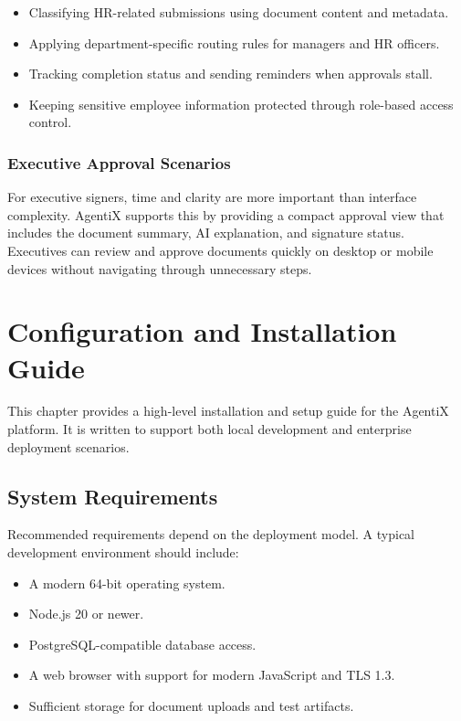 \documentclass[12pt,oneside,openright,a4paper]{cpe-english-project}
\begin{document}
\begin{itemize}
  \item Classifying HR-related submissions using document content and metadata.
  \item Applying department-specific routing rules for managers and HR officers.
  \item Tracking completion status and sending reminders when approvals stall.
  \item Keeping sensitive employee information protected through role-based access control.
\end{itemize}

\subsection{Executive Approval Scenarios}

For executive signers, time and clarity are more important than interface complexity. AgentiX supports this by providing a compact approval view that includes the document summary, AI explanation, and signature status. Executives can review and approve documents quickly on desktop or mobile devices without navigating through unnecessary steps.

\chapter{Configuration and Installation Guide}

This chapter provides a high-level installation and setup guide for the AgentiX platform. It is written to support both local development and enterprise deployment scenarios.

\section{System Requirements}

Recommended requirements depend on the deployment model. A typical development environment should include:

\begin{itemize}
  \item A modern 64-bit operating system.
  \item Node.js 20 or newer.
  \item PostgreSQL-compatible database access.
  \item A web browser with support for modern JavaScript and TLS 1.3.
  \item Sufficient storage for document uploads and test artifacts.
\end{itemize}
\end{document}
